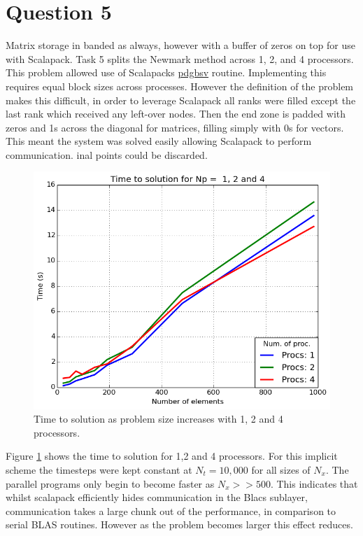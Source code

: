 \documentclass[10pt, a4paper]{article}
\begin{document}
\section*{Question 5}
Matrix storage in banded as always, however with a buffer of zeros on top for use with Scalapack. Task 5 splits the Newmark method across 1, 2, and 4 processors. This problem allowed use of Scalapacks \url{pdgbsv} routine. Implementing this requires equal block sizes across processes. However the definition of the problem makes this difficult, in order to leverage Scalapack all ranks were filled except the last rank which received any left-over nodes. Then the end zone is padded with zeros and 1s across the diagonal for matrices, filling simply with 0s for vectors. This meant the system was solved easily allowing Scalapack to perform communication. inal points could be discarded.

\begin{figure}[!htb]
  \centering
	  \includegraphics[width=.5\linewidth, clip=true, trim=0cm 0cm 0cm 0cm]{task5_timing}
  \caption{Time to solution as problem size increases with 1, 2 and 4 processors.}
  \label{fig:timing5}
\end{figure}%
\noindent
Figure \ref{fig:timing5} shows the time to solution for 1,2 and 4 processors. For this implicit scheme the timesteps were kept constant at $N_t = 10,000$ for all sizes of $N_x$. The parallel programs only begin to become faster as $N_x >> 500$. This indicates that whilst scalapack efficiently hides communication in the Blacs sublayer, communication takes a large chunk out of the performance, in comparison to serial BLAS routines. However as the problem becomes larger this effect reduces.

%
\end{document}
